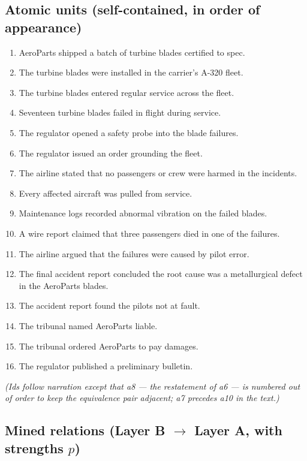 \documentclass[11pt]{article}
\begin{document}
\subsection*{Atomic units (self-contained, in order of appearance)}
\begin{enumerate}[label=\textbf{a\arabic*.},leftmargin=*,nosep]
  \item AeroParts shipped a batch of turbine blades certified to spec.
  \item The turbine blades were installed in the carrier's A-320 fleet.
  \item The turbine blades entered regular service across the fleet.
  \item Seventeen turbine blades failed in flight during service.
  \item The regulator opened a safety probe into the blade failures.
  \item The regulator issued an order grounding the fleet.
  \item The airline stated that no passengers or crew were harmed in the incidents.
  \item Every affected aircraft was pulled from service.
  \item Maintenance logs recorded abnormal vibration on the failed blades.
  \item A wire report claimed that three passengers died in one of the failures.
  \item The airline argued that the failures were caused by pilot error.
  \item The final accident report concluded the root cause was a metallurgical defect in the AeroParts blades.
  \item The accident report found the pilots not at fault.
  \item The tribunal named AeroParts liable.
  \item The tribunal ordered AeroParts to pay damages.
  \item The regulator published a preliminary bulletin.
\end{enumerate}
\emph{(Ids follow narration except that a8 --- the restatement of a6 --- is numbered out of
order to keep the equivalence pair adjacent; a7 precedes a10 in the text.)}

\subsection*{Mined relations (Layer B $\to$ Layer A, with strengths $p$)}
\end{document}
